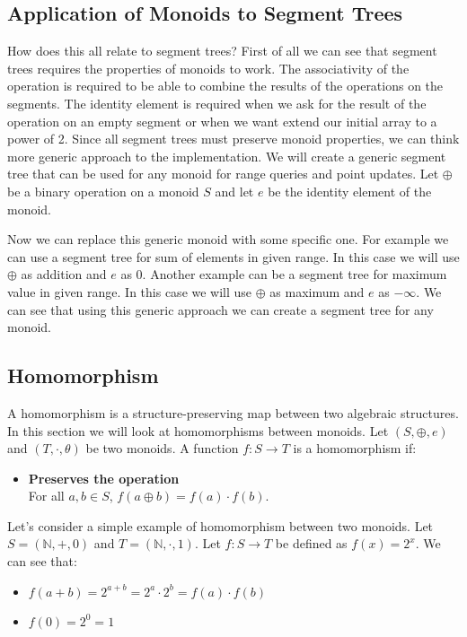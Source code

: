 \documentclass[11pt]{article}
\begin{document}
\subsection{Application of Monoids to Segment Trees}
How does this all relate to segment trees?
First of all we can see that segment trees requires the properties of monoids to work.
The associativity of the operation is required to be able to combine the results of the operations on the segments.
The identity element is required when we ask for the result of the operation on an empty segment or 
when we want extend our initial array to a power of 2. 
Since all segment trees must preserve monoid properties, we can think more generic 
approach to the implementation. We will create a generic segment tree that can be used for any monoid for 
range queries and point updates. Let \(\oplus\) be a binary operation on a monoid \(S\) and let \(e\) be the identity element of the monoid.


\FloatBarrier
Now we can replace this generic monoid with some specific one.
For example we can use a segment tree for sum of elements in given range.
In this case we will use \(\oplus\) as addition and \(e\) as 0. 
Another example can be a segment tree for maximum value in given range.
In this case we will use \(\oplus\) as maximum and \(e\) as \(-\infty\).
We can see that using this generic approach we can create a segment tree for any monoid.

\subsection{Homomorphism}
A homomorphism is a structure-preserving map between two algebraic structures.
In this section we will look at homomorphisms between monoids.
Let \( (S, \oplus, e) \) and \( (T, \cdot, \theta) \) be two monoids.
A function \( f: S \to T \) is a homomorphism if:
\begin{itemize}
    \item \textbf{Preserves the operation} \\
    For all \( a, b \in S \), \( f(a \oplus b) = f(a) \cdot f(b) \).
\end{itemize}
Let's consider a simple example of homomorphism between two monoids.
Let \( S = (\mathbb{N}, +, 0) \) and \( T = (\mathbb{N}, \cdot, 1) \).
Let \( f: S \to T \) be defined as \( f(x) = 2^x \).
We can see that:
\begin{itemize}
    \item \( f(a + b) = 2^{a + b} = 2^a \cdot 2^b = f(a) \cdot f(b) \)
    \item \( f(0) = 2^0 = 1 \)
\end{itemize}
\end{document}
